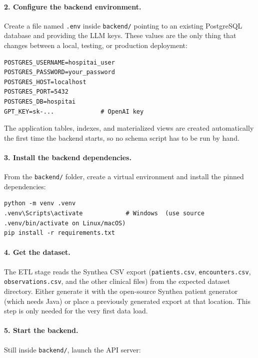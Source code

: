 \paragraph{2. Configure the backend environment.} Create a file named \texttt{.env} inside \texttt{backend/} pointing to an existing PostgreSQL database and providing the LLM keys. These values are the only thing that changes between a local, testing, or production deployment:

\begin{lstlisting}[style=basestyle]
POSTGRES_USERNAME=hospitai_user
POSTGRES_PASSWORD=your_password
POSTGRES_HOST=localhost
POSTGRES_PORT=5432
POSTGRES_DB=hospitai
GPT_KEY=sk-...             # OpenAI key
\end{lstlisting}

\noindent The application tables, indexes, and materialized views are created automatically the first time the backend starts, so no schema script has to be run by hand.

\paragraph{3. Install the backend dependencies.} From the \texttt{backend/} folder, create a virtual environment and install the pinned dependencies:

\begin{lstlisting}[style=basestyle]
python -m venv .venv
.venv\Scripts\activate            # Windows  (use source .venv/bin/activate on Linux/macOS)
pip install -r requirements.txt
\end{lstlisting}

\paragraph{4. Get the dataset.} The ETL stage reads the Synthea CSV export (\texttt{patients.csv}, \texttt{encounters.csv}, \texttt{observations.csv}, and the other clinical files) from the expected dataset directory. Either generate it with the open-source Synthea patient generator (which needs Java) or place a previously generated export at that location. This step is only needed for the very first data load.

\paragraph{5. Start the backend.} Still inside \texttt{backend/}, launch the API server:

